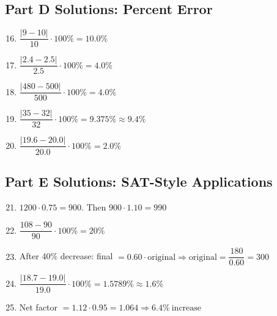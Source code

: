 \documentclass[14pt]{extarticle}
\begin{document}
\subsection*{Part D Solutions: Percent Error}
\begin{enumerate}
  \setcounter{enumi}{15}
  \item \(\dfrac{|9-10|}{10}\cdot100\%=\boxed{10.0\%}\)
  \item \(\dfrac{|2.4-2.5|}{2.5}\cdot100\%=\boxed{4.0\%}\)
  \item \(\dfrac{|480-500|}{500}\cdot100\%=\boxed{4.0\%}\)
  \item \(\dfrac{|35-32|}{32}\cdot100\%=9.375\%\approx\boxed{9.4\%}\)
  \item \(\dfrac{|19.6-20.0|}{20.0}\cdot100\%=\boxed{2.0\%}\)
\end{enumerate}

\subsection*{Part E Solutions: SAT-Style Applications}
\begin{enumerate}
  \setcounter{enumi}{20}
  \item \(1200\cdot0.75=900\). Then \(900\cdot1.10=\boxed{990}\)
  \item \(\dfrac{108-90}{90}\cdot100\%=\boxed{20\%}\)
  \item After 40\% decrease: final \(=0.60\cdot \text{original}\Rightarrow \text{original}=\dfrac{180}{0.60}=\boxed{300}\)
  \item \(\dfrac{|18.7-19.0|}{19.0}\cdot100\%=1.5789\%\approx\boxed{1.6\%}\)
  \item Net factor \(=1.12\cdot0.95=1.064\Rightarrow \boxed{6.4\%\ \text{increase}}\)
\end{enumerate}




\end{document}
